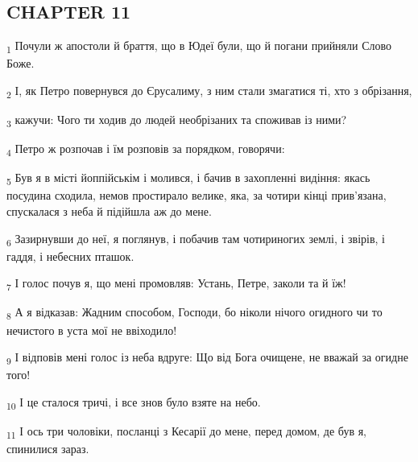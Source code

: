 \subsection{CHAPTER 11}
\begin{tcolorbox}
\textsubscript{1} Почули ж апостоли й браття, що в Юдеї були, що й погани прийняли Слово Боже.
\end{tcolorbox}
\begin{tcolorbox}
\textsubscript{2} І, як Петро повернувся до Єрусалиму, з ним стали змагатися ті, хто з обрізання,
\end{tcolorbox}
\begin{tcolorbox}
\textsubscript{3} кажучи: Чого ти ходив до людей необрізаних та споживав із ними?
\end{tcolorbox}
\begin{tcolorbox}
\textsubscript{4} Петро ж розпочав і їм розповів за порядком, говорячи:
\end{tcolorbox}
\begin{tcolorbox}
\textsubscript{5} Був я в місті йоппійськім і молився, і бачив в захопленні видіння: якась посудина сходила, немов простирало велике, яка, за чотири кінці прив'язана, спускалася з неба й підійшла аж до мене.
\end{tcolorbox}
\begin{tcolorbox}
\textsubscript{6} Зазирнувши до неї, я поглянув, і побачив там чотириногих землі, і звірів, і гаддя, і небесних пташок.
\end{tcolorbox}
\begin{tcolorbox}
\textsubscript{7} І голос почув я, що мені промовляв: Устань, Петре, заколи та й їж!
\end{tcolorbox}
\begin{tcolorbox}
\textsubscript{8} А я відказав: Жадним способом, Господи, бо ніколи нічого огидного чи то нечистого в уста мої не ввіходило!
\end{tcolorbox}
\begin{tcolorbox}
\textsubscript{9} І відповів мені голос із неба вдруге: Що від Бога очищене, не вважай за огидне того!
\end{tcolorbox}
\begin{tcolorbox}
\textsubscript{10} І це сталося тричі, і все знов було взяте на небо.
\end{tcolorbox}
\begin{tcolorbox}
\textsubscript{11} І ось три чоловіки, посланці з Кесарії до мене, перед домом, де був я, спинилися зараз.
\end{tcolorbox}
